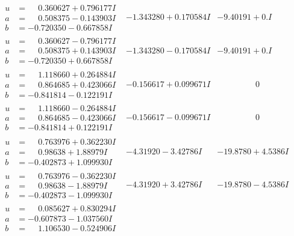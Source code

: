 \documentclass[1p]{elsarticle_modified}
\theoremstyle{definition}
\begin{document}
$$\begin{array}{c|c|c}
\begin{aligned}
u &= \phantom{-}0.360627 + 0.796177 I \\
a &= \phantom{-}0.508375 - 0.143903 I \\
b &= -0.720350 - 0.667858 I\end{aligned}
 & -1.343280 + 0.170584 I & -9.40191 + 0. I\phantom{ +0.000000I} \\ \hline\begin{aligned}
u &= \phantom{-}0.360627 - 0.796177 I \\
a &= \phantom{-}0.508375 + 0.143903 I \\
b &= -0.720350 + 0.667858 I\end{aligned}
 & -1.343280 - 0.170584 I & -9.40191 + 0. I\phantom{ +0.000000I} \\ \hline\begin{aligned}
u &= \phantom{-}1.118660 + 0.264884 I \\
a &= \phantom{-}0.864685 + 0.423066 I \\
b &= -0.841814 - 0.122191 I\end{aligned}
 & -0.156617 + 0.099671 I & \phantom{-0.000000 } 0 \\ \hline\begin{aligned}
u &= \phantom{-}1.118660 - 0.264884 I \\
a &= \phantom{-}0.864685 - 0.423066 I \\
b &= -0.841814 + 0.122191 I\end{aligned}
 & -0.156617 - 0.099671 I & \phantom{-0.000000 } 0 \\ \hline\begin{aligned}
u &= \phantom{-}0.763976 + 0.362230 I \\
a &= \phantom{-}0.98638 + 1.88979 I \\
b &= -0.402873 + 1.099930 I\end{aligned}
 & -4.31920 - 3.42786 I & -19.8780 + 4.5386 I \\ \hline\begin{aligned}
u &= \phantom{-}0.763976 - 0.362230 I \\
a &= \phantom{-}0.98638 - 1.88979 I \\
b &= -0.402873 - 1.099930 I\end{aligned}
 & -4.31920 + 3.42786 I & -19.8780 - 4.5386 I \\ \hline\begin{aligned}
u &= \phantom{-}0.085627 + 0.830294 I \\
a &= -0.607873 - 1.037560 I \\
b &= \phantom{-}1.106530 - 0.524906 I\end{aligned}

\end{array}$$
\end{document}
